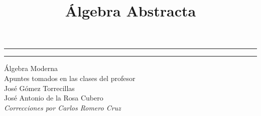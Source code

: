 \documentclass[12pt,a4paper]{article}
\title{Álgebra Abstracta}
\date{}
\theoremstyle{definition}
\theoremstyle{definition}
\theoremstyle{definition}
\theoremstyle{remark}
\theoremstyle{plain}
\theoremstyle{plain}
\theoremstyle{plain}
\begin{document}
\begin{titlepage}

	\centering
	\scshape
	\vspace*{\baselineskip}
	\rule{\textwidth}{1.6pt}\vspace*{-\baselineskip}\vspace*{2pt}
	\rule{\textwidth}{0.4pt}
	\vspace{0.75\baselineskip}
	{\Huge Álgebra Moderna\\}
	\vspace{3cm}
	{\large Apuntes tomados en las clases del profesor\\José Gómez Torrecillas\\}
	\vspace{5cm}
    {\large José Antonio de la Rosa Cubero\\}
    \textit{Correcciones por Carlos Romero Cruz}
	
\end{titlepage}

\tableofcontents
\newpage






















































\end{document}
